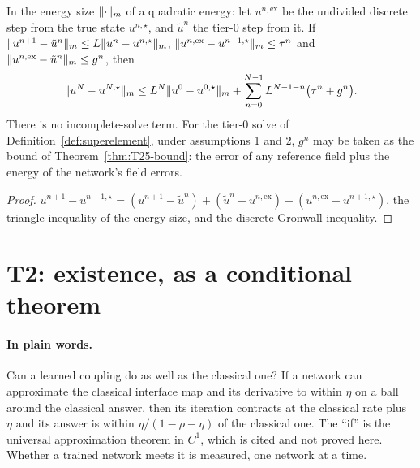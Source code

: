\begin{theorem}[T22, tier 0]\label{thm:T22-tier0}
  \leanok
  In the energy size $\lVert \cdot\rVert_m$ of a quadratic energy: let
  $u^{n,\mathrm{ex}}$ be the undivided discrete step from the true state
  $u^{n,\star}$, and $\tilde u^n$ the tier-0 step from it.  If
  $\lVert u^{n+1}-\tilde u^n\rVert_m\le L\lVert u^n-u^{n,\star}\rVert_m$,
  $\lVert u^{n,\mathrm{ex}}-u^{n+1,\star}\rVert_m\le\tau^n$ and
  $\lVert u^{n,\mathrm{ex}}-\tilde u^n\rVert_m\le g^n$, then
  \[
    \lVert u^N-u^{N,\star}\rVert_m\le L^N\lVert u^0-u^{0,\star}\rVert_m
      +\sum_{n=0}^{N-1}L^{N-1-n}\bigl(\tau^n+g^n\bigr).
  \]
  There is no incomplete-solve term.  For the tier-0 solve of
  Definition~\ref{def:superelement}, under assumptions 1 and 2, $g^n$ may be
  taken as the bound of Theorem~\ref{thm:T25-bound}: the error of any reference
  field plus the energy of the network's field errors.
\end{theorem}

\begin{proof}
  \leanok
  $u^{n+1}-u^{n+1,\star}=(u^{n+1}-\tilde u^n)+(\tilde u^n-u^{n,\mathrm{ex}})
  +(u^{n,\mathrm{ex}}-u^{n+1,\star})$, the triangle inequality of the energy
  size, and the discrete Gronwall inequality.
\end{proof}

\section{T2: existence, as a conditional theorem}

\paragraph{In plain words.}
Can a learned coupling do as well as the classical one?  If a network can
approximate the classical interface map and its derivative to within $\eta$ on
a ball around the classical answer, then its iteration contracts at the
classical rate plus $\eta$ and its answer is within $\eta/(1-\rho-\eta)$ of
the classical one.  The ``if'' is the universal approximation theorem in
$C^1$, which is cited and not proved here.  Whether a trained network meets
it is measured, one network at a time.

